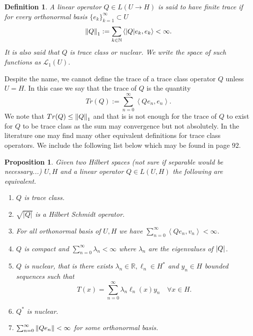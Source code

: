 \documentclass[12pt]{article}
\newcommand{\br}[1]{\left\langle#1\right\rangle}
\newcommand{\R}{{\mathbb R}}
\newtheorem{proposition}{Proposition}
\newtheorem{definition}{Definition}
\begin{document}
\begin{definition}
	A linear operator $Q\in L(U\to H)$ is said to have finite trace if for every orthonormal basis $\{e_k\}_{k=1}^\infty \subset  U$
	\begin{equation*}
		\norm{Q}_1:=\sum_{k\in\mathbb{N}}\br{\abs{Q}e_k,e_k}<\infty.
	\end{equation*}
	It is also said that $Q$ is trace class or nuclear. We write the space of such functions as $\mathcal{L}_1(U)$.
\end{definition}
Despite the name, we cannot define the trace of a trace class operator $Q$ unless  $U=H$. In this case we say that the trace of $Q$ is the quantity
\begin{equation*}
	Tr(Q):=\sum_{n=0}^{\infty} \br{Q e_n,e_n}.
\end{equation*}
We note that $Tr(Q)\leq \norm{Q}_1$ and that is is not enough for the trace of $Q$ to exist for $Q$ to be trace class as the sum may convergence but not absolutely. In the literature one may find many other equivalent definitions for trace class operators. We include the following list below which may be found in \cite{lototsky2017stochastic} page $92$.
\begin{proposition} Given two Hilbert spaces (not sure if separable would be necessary...) $U,H$ and a linear operator  $Q\in L(U,H)$ the following are equivalent.
	\begin{enumerate}
		\item $Q$ is trace class.
		\item $\sqrt{|Q|} $ is a Hilbert Schmidt operator.
		\item For all orthonormal basis of $U,H$ we have $\sum_{n=0}^{\infty} \br{Qe_n,v_n}<\infty$.
		\item $Q$ is compact and  $\sum_{n=0}^{\infty} \lambda _n<\infty$ where $\lambda _n$ are the eigenvalues of $\abs{Q}$.
		\item $Q$ is nuclear, that is there exists  $\lambda _n \in \R,\ell_n \in H^*$ and $y_n \in H$ bounded sequences such that
		      \begin{equation*}
			      T(x)=\sum_{n=0}^{\infty} \lambda _n\ell_n(x)y_n \quad\forall x\in H.
		      \end{equation*}
		\item $Q^*$ is nuclear.
		\item $\sum_{n=0}^{\infty} \norm{Qe_n}<\infty$ for some orthonormal basis.

	\end{enumerate}
\end{proposition}
\end{document}
